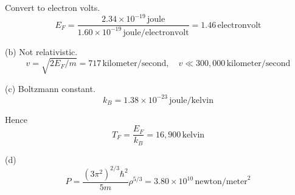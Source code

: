 Convert to electron volts.
\begin{equation*}
E_F=\frac{2.34\times10^{-19}\,\text{joule}}{1.60\times10^{-19}\,\text{joule/electronvolt}}
=1.46\,\text{electronvolt}
\end{equation*}

(b) Not relativistic.
\begin{equation*}
v=\sqrt{2E_F/m}=717\,\text{kilometer/second},\quad
v\ll300{,}000\,\text{kilometer/second}
\end{equation*}

(c) Boltzmann constant.
\begin{equation*}
k_B=1.38\times10^{-23}\,\text{joule/kelvin}
\end{equation*}

Hence
\begin{equation*}
T_F=\frac{E_F}{k_B}=16{,}900\,\text{kelvin}
\end{equation*}

(d)
\begin{equation*}
P=\frac{\left(3\pi^2\right)^{2/3}\hbar^2}{5m}\rho^{5/3}=3.80\times10^{10}\,\text{newton/meter}^2
\end{equation*}


